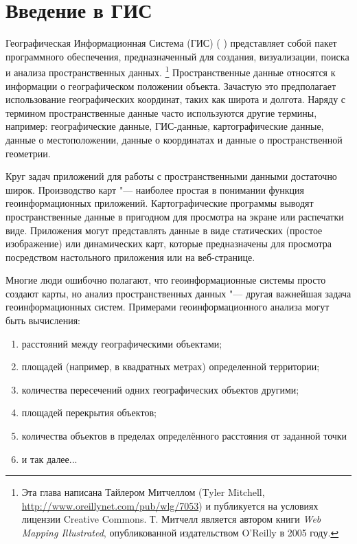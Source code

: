 \pagestyle{scrheadings}
\chapter{Введение в ГИС}\label{label_intro}


Географическая Информационная Система (ГИС) (\cite{mitchel05}
) представляет собой пакет программного обеспечения, предназначенный для
создания, визуализации, поиска и анализа пространственных данных.
\footnote{Эта глава написана Тайлером Митчеллом (Tyler Mitchell, 
\url{http://www.oreillynet.com/pub/wlg/7053}) и публикуется на условиях
лицензии Creative Commons. Т. Митчелл является автором книги
\textit{Web Mapping Illustrated}, опубликованной издательством O'Reilly
в 2005 году.}
Пространственные данные относятся к информации
о географическом положении объекта. Зачастую это предполагает
использование географических координат, таких как широта и долгота. Наряду с термином пространственные данные часто используются
другие термины, например: географические данные, ГИС-данные,
картографические данные, данные о местоположении, данные о координатах
и данные о пространственной геометрии.

Круг задач приложений для работы с пространственными данными достаточно широк.
Производство карт "--- наиболее простая в понимании функция
геоинформационных приложений. Картографические программы выводят
пространственные данные в пригодном для просмотра на экране или распечатки виде.
Приложения могут представлять данные в виде статических (простое изображение) или
динамических карт, которые предназначены для просмотра посредством
настольного приложения или на веб-странице.

Многие люди ошибочно полагают, что геоинформационные системы просто
создают карты, но анализ пространственных данных "--- другая важнейшая
задача геоинформационных систем. Примерами геоинформационного анализа
могут быть вычисления:

\begin{enumerate}
\item расстояний между географическими объектами;
\item площадей (например, в квадратных метрах) определенной территории;
\item количества пересечений одних географических объектов другими;
\item площадей перекрытия объектов;
\item количества объектов в пределах определённого расстояния от заданной точки
\item и так далее...
\end{enumerate}

